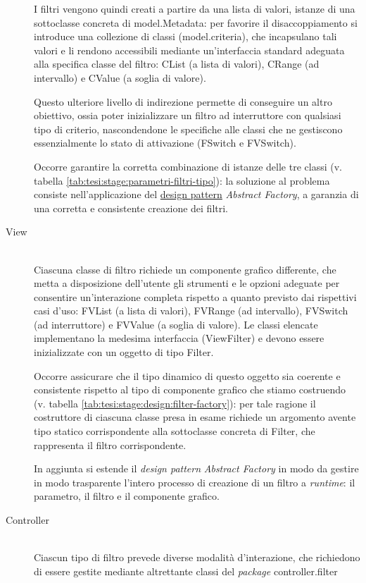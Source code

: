 \begin{description}
	I filtri vengono quindi creati a partire da una lista di valori, istanze di una sottoclasse concreta di \textsf{model.Metadata}: per favorire il disaccoppiamento si introduce una collezione di classi (\textsf{model.criteria}), che incapsulano tali valori e li rendono accessibili mediante un'interfaccia standard adeguata alla specifica classe del filtro: \textsf{CList} (a lista di valori), \textsf{CRange} (ad intervallo) e \textsf{CValue} (a soglia di valore).

	Questo ulteriore livello di indirezione permette di conseguire un altro obiettivo, ossia poter inizializzare un filtro ad interruttore con qualsiasi tipo di criterio, nascondendone le specifiche alle classi che ne gestiscono essenzialmente lo stato di attivazione (\textsf{FSwitch} e \textsf{FVSwitch}).  

	Occorre garantire la corretta combinazione di istanze delle tre classi (v. tabella \ref{tab:tesi:stage:parametri-filtri-tipo}): la soluzione al problema consiste nell'applicazione del \underline{design pattern} \textit{Abstract Factory}, a garanzia di una corretta e consistente creazione dei filtri.

	\item[View] \hfill \\
	Ciascuna classe di filtro richiede un componente grafico differente, che metta a disposizione dell'utente gli strumenti e le opzioni adeguate per consentire un'interazione completa rispetto a quanto previsto dai rispettivi casi d'uso: \textsf{FVList} (a lista di valori), \textsf{FVRange} (ad intervallo), \textsf{FVSwitch} (ad interruttore) e \textsf{FVValue} (a soglia di valore). Le classi elencate implementano la medesima interfaccia (\textsf{ViewFilter}) e devono essere inizializzate con un oggetto di tipo \textsf{Filter}.

	Occorre assicurare che il tipo dinamico di questo oggetto sia coerente e consistente rispetto al tipo di componente grafico che stiamo costruendo (v. tabella \ref{tab:tesi:stage:design:filter-factory}): per tale ragione il costruttore di ciascuna classe presa in esame richiede un argomento avente tipo statico corrispondente alla sottoclasse concreta di \textsf{Filter}, che rappresenta il filtro corrispondente.

	In aggiunta si estende il \textit{design pattern} \textit{Abstract Factory} in modo da gestire in modo trasparente l'intero processo di creazione di un filtro a \textit{runtime}: il parametro, il filtro e il componente grafico.

	\item[Controller] \hfill \\
	Ciascun tipo di filtro prevede diverse modalità d'interazione, che richiedono di essere gestite mediante altrettante classi del \textit{package} \textsf{controller.filter}
\end{description}

